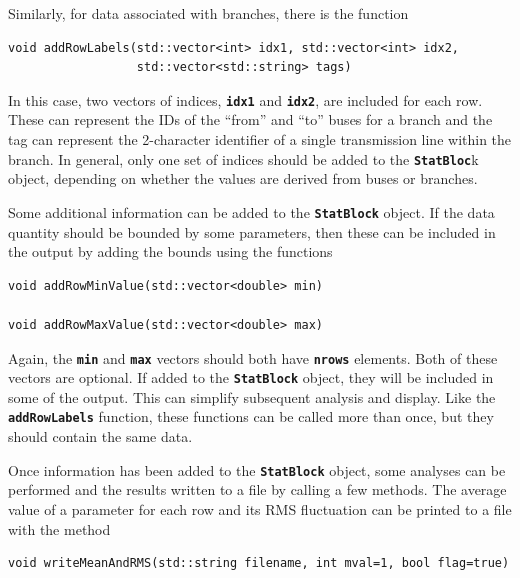 Similarly, for data associated with branches, there is the function

{
\color{red}
\begin{Verbatim}[fontseries=b]
void addRowLabels(std::vector<int> idx1, std::vector<int> idx2,
                  std::vector<std::string> tags)
\end{Verbatim}
}

In this case, two vectors of indices, \texttt{\textbf{idx1}} and \texttt{\textbf{idx2}}, are included for each row. These can represent the IDs of the ``from'' and ``to'' buses for a branch and the tag can represent the 2-character identifier of a single transmission line within the branch. In general, only one set of indices should be added to the \texttt{\textbf{StatBloc}}k object, depending on whether the values are derived from buses or branches.

Some additional information can be added to the \texttt{\textbf{StatBlock}} object. If the data quantity should be bounded by some parameters, then these can be included in the output by adding the bounds using the functions

{
\color{red}
\begin{Verbatim}[fontseries=b]
void addRowMinValue(std::vector<double> min)

void addRowMaxValue(std::vector<double> max)
\end{Verbatim}
}

Again, the \texttt{\textbf{min}} and \texttt{\textbf{max}} vectors should both have \texttt{\textbf{nrows}} elements. Both of these vectors are optional. If added to the \texttt{\textbf{StatBlock}} object, they will be included in some of the output. This can simplify subsequent analysis and display. Like the \texttt{\textbf{addRowLabels}} function, these functions can be called more than once, but they should contain the same data.

Once information has been added to the \texttt{\textbf{StatBlock}} object, some analyses can be performed and the results written to a file by calling a few methods. The average value of a parameter for each row and its RMS fluctuation can be printed to a file with the method

{
\color{red}
\begin{Verbatim}[fontseries=b]
void writeMeanAndRMS(std::string filename, int mval=1, bool flag=true)
\end{Verbatim}
}

